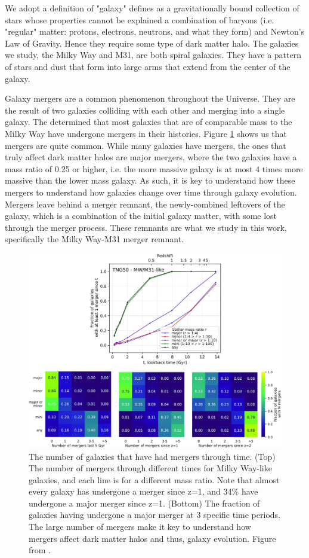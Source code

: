 \documentclass[linenumbers]{aastex631}
\begin{document}
We adopt a definition of "galaxy" \cite{Willman} defines as a gravitationally bound collection of stars whose properties cannot be explained a combination of baryons (i.e. "regular" matter: protons, electrons, neutrons, and what they form) and Newton's Law of Gravity. Hence they require some type of dark matter halo. The galaxies we study, the Milky Way and M31, are both spiral galaxies. They have a pattern of stars and dust that form into large arms that extend from the center of the galaxy.

Galaxy mergers are a common phenomenon throughout the Universe. They are the result of two galaxies colliding with each other and merging into a single galaxy. The \cite{Sotillo-Ramos} determined that most galaxies that are of comparable mass to the Milky Way have undergone mergers in their histories. Figure \ref{fig:mergers} shows us that mergers are quite common. While many galaxies have mergers, the ones that truly affect dark matter halos are major mergers, where the two galaxies have a mass ratio of 0.25 or higher, i.e. the more massive galaxy is at most 4 times more massive than the lower mass galaxy. As such, it is key to understand how these mergers to understand how galaxies change over time through galaxy evolution. Mergers leave behind a merger remnant, the newly-combined leftovers of the galaxy, which is a combination of the initial galaxy matter, with some lost through the merger process. These remnants are what we study in this work, specifically the Milky Way-M31 merger remnant.

\begin{figure}
    \centering
    \includegraphics[width=\textwidth]{mergerNumbers.jpeg}
    \caption{The number of galaxies that have had mergers through time. (Top) The number of mergers through different times for Milky Way-like galaxies, and each line is for a different mass ratio. Note that almost every galaxy has undergone a merger since z=1, and 34\% have undergone a major merger since z=1. (Bottom) The fraction of galaxies having undergone a major merger at 3 specific time periods. The large number of mergers make it key to understand how mergers affect dark matter halos and thus, galaxy evolution. Figure from \cite{Sotillo-Ramos}.}
    \label{fig:mergers}
\end{figure}
\end{document}
